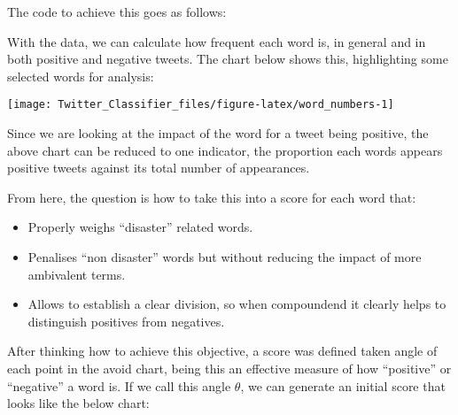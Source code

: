 \documentclass[11pt,]{article}
\newenvironment{Shaded}{\begin{snugshade}}{\end{snugshade}}
\newcommand{\DataTypeTok}[1]{\textcolor[rgb]{0.13,0.29,0.53}{#1}}
\newcommand{\KeywordTok}[1]{\textcolor[rgb]{0.13,0.29,0.53}{\textbf{#1}}}
\newcommand{\NormalTok}[1]{#1}
\newcommand{\OperatorTok}[1]{\textcolor[rgb]{0.81,0.36,0.00}{\textbf{#1}}}
\newcommand{\StringTok}[1]{\textcolor[rgb]{0.31,0.60,0.02}{#1}}
\providecommand{\tightlist}{%
  \setlength{\itemsep}{0pt}\setlength{\parskip}{0pt}}
\begin{document}
The code to achieve this goes as follows:

\begin{Shaded}
\end{Shaded}

With the data, we can calculate how frequent each word is, in general
and in both positive and negative tweets. The chart below shows this,
highlighting some selected words for analysis:

\begin{center}\texttt{[image: Twitter\_Classifier\_files/figure-latex/word\_numbers-1]} \end{center}

Since we are looking at the impact of the word for a tweet being
positive, the above chart can be reduced to one indicator, the
proportion each words appears positive tweets against its total number
of appearances.

From here, the question is how to take this into a score for each word
that:

\begin{itemize}
\tightlist
\item
  Properly weighs ``disaster'' related words.
\item
  Penalises ``non disaster'' words but without reducing the impact of
  more ambivalent terms.
\item
  Allows to establish a clear division, so when compoundend it clearly
  helps to distinguish positives from negatives.
\end{itemize}

After thinking how to achieve this objective, a score was defined taken
angle of each point in the avoid chart, being this an effective measure
of how ``positive'' or ``negative'' a word is. If we call this angle
\(\theta\), we can generate an initial score that looks like the below
chart:
\end{document}
